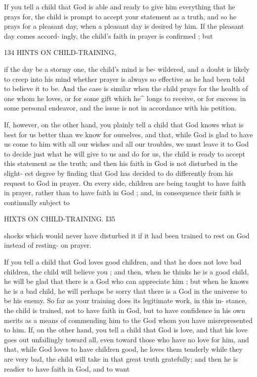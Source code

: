\documentclass[
]{book}
\begin{document}
If you tell a child that God is able and ready to give him everything that he prays for, the child is prompt to accept your statement as a truth, and so he prays for a pleasant day, when a pleasant day is desired by him. If the pleasant day comes accord- ingly, the child's faith in prayer is confirmed ; but

134 HINTS ON CHILD-TRAINING,

if the day be a stormy one, the child's mind is be- wildered, and a doubt is likely to creep into his mind whether prayer is always so effective as he had been told to believe it to be. And the case is similar when the child prays for the health of one whom he loves, or for some gift which he\^{} longs to receive, or for success in some personal endeavor, and the issue is not in accordance with his petition.

If, however, on the other hand, you plainly tell a child that God knows what is best for us better than we know for ourselves, and that, while God is glad to have us come to him with all our wishes and all our troubles, we must leave it to God to decide just what he will give to us and do for us, the child is ready to accept this statement as the truth; and then his faith in God is not disturbed in the slight- est degree by finding that God has decided to do differently from his request to God in prayer. On every side, children are being taught to have faith in prayer, rather than to have faith in God ; and, in consequence their faith is continually subject to

HIXTS ON CHILD-TRAINING. I35

shocks which would never have disturbed it if it had been trained to rest on God instead of resting- on prayer.

If you tell a child that God loves good children, and that he does not love bad children, the child will believe you ; and then, when he thinks he is a good child, he will be glad that there is a God who can appreciate him ; but when he knows he is a bad child, he will perhaps be sorry that there is a God in the universe to be his enemy. So far as your training does its legitimate work, in this in- stance, the child is trained, not to have faith in God, but to have confidence in his own merits as a means of commending him to the God whom you have misrepresented to him. If, on the other hand, you tell a child that God is love, and that his love goes out unfailingly toward all, even toward those who have no love for him, and that, while God loves to have children good, he loves them tenderly while they are very bad, the child will take in that great truth gratefully; and then he is readier to have faith in God, and to want
\end{document}
